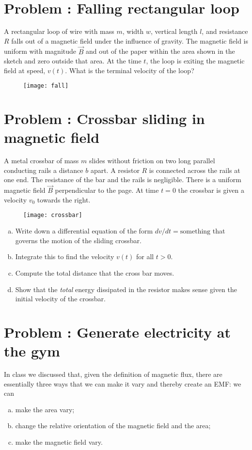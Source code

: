 \documentclass[problems]{esg8022pset}
\date{\today }
\begin{document}
\section{Problem \thesection: Falling rectangular loop}
  A rectangular loop of wire with mass $m$, width $w$, vertical length $l$, and
  resistance $R$ falls out of a magnetic field under the influence of gravity.
  The magnetic field is uniform with magnitude $\vec{B}$ and out of the paper
  within the area shown in the sketch and zero outside that area. At the time
  $t$, the loop is exiting the magnetic field at speed, $v(t)$. What is the
  terminal velocity of the loop?

  \begin{figure}[H]
    \centering
    \texttt{[image: fall]}
    \label{fig:fall}
  \end{figure}
\section{Problem \thesection: Crossbar sliding in magnetic field}
  A metal crossbar of mass $m$ slides without friction on two long parallel
  conducting rails a distance $b$ apart.  A resistor $R$ is connected across
  the rails at one end. The resistance of the bar and the rails is negligible.
  There is a uniform magnetic field $\vec{B}$ perpendicular to the page. At
  time $t=0$ the crossbar is given a velocity $v_0$ towards the right.

  \begin{figure}[H]
    \centering
    \texttt{[image: crossbar]}
    \label{fig:crossbar}
  \end{figure}

  \begin{enumerate}[(a)]
    \item Write down a differential equation of the form $dv/dt =
      \text{something}$ that governs the motion of the sliding crossbar.
    \item Integrate this to find the velocity $v(t)$ for all $t > 0$.
    \item Compute the total distance that the cross bar moves.
    \item Show that the \emph{total} energy dissipated in the resistor makes
      sense given the initial velocity of the crossbar.
  \end{enumerate}
\section{Problem \thesection: Generate electricity at the gym}
  In class we discussed that, given the definition of magnetic flux, there are
  essentially three ways that we can make it vary and thereby create an EMF: we
  can
  \begin{enumerate}[(a)]
    \item make the area vary;
    \item change the relative orientation of the magnetic field and the area;
    \item make the magnetic field vary.
  \end{enumerate}
\end{document}
